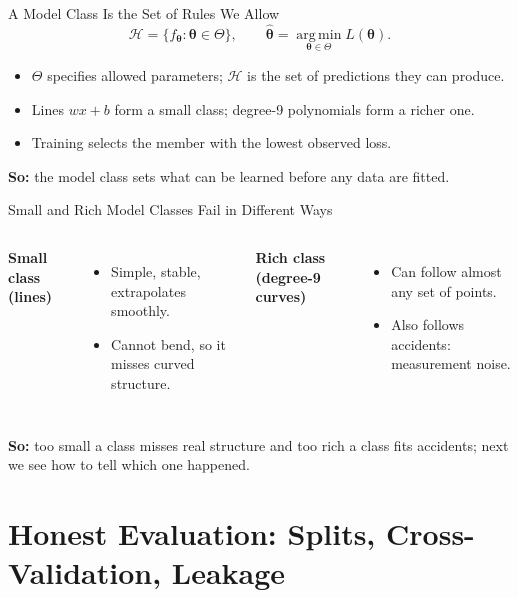 \documentclass{ntuabeamer}
\newcommand{\takeaway}[1]{\par\vspace{0.3cm}\begingroup\raggedright\noindent
  {\color{courseblue}\textbf{So:}} #1\par\endgroup}
\begin{document}
\begin{frame}{A Model Class Is the Set of Rules We Allow}
  \[
    \mathcal H=\{f_{\boldsymbol\theta}:\boldsymbol\theta\in\Theta\},
    \qquad
    \hat{\boldsymbol\theta}=\operatorname*{arg\,min}_{\boldsymbol\theta\in\Theta}L(\boldsymbol\theta).
  \]
  \begin{itemize}
    \item $\Theta$ specifies allowed parameters; $\mathcal H$ is the set of predictions they can produce.
    \item Lines $wx+b$ form a small class; degree-9 polynomials form a richer one.
    \item Training selects the member with the lowest observed loss.
  \end{itemize}
  \takeaway{the model class sets what can be learned before any data are fitted.}
\end{frame}

\begin{frame}{Small and Rich Model Classes Fail in Different Ways}
  \begin{columns}[T]
    \textbf{Small class (lines)}
    \begin{itemize}
      \item Simple, stable, extrapolates smoothly.
      \item Cannot bend, so it misses curved structure.
    \end{itemize}
    \textbf{Rich class (degree-9 curves)}
    \begin{itemize}
      \item Can follow almost any set of points.
      \item Also follows accidents: measurement noise.
    \end{itemize}
  \end{columns}
  \takeaway{too small a class misses real structure and too rich a class fits accidents; next we see how to tell which one happened.}
\end{frame}


\section{Honest Evaluation: Splits, Cross-Validation, Leakage}
\end{document}
